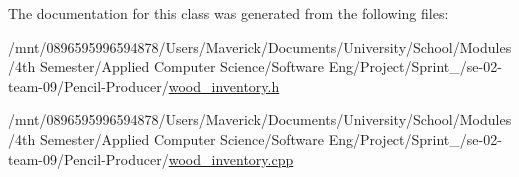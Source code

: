 The documentation for this class was generated from the following files\+:\begin{DoxyCompactItemize}
\item 
/mnt/0896595996594878/\+Users/\+Maverick/\+Documents/\+University/\+School/\+Modules/4th Semester/\+Applied Computer Science/\+Software Eng/\+Project/\+Sprint\+\_/se-\/02-\/team-\/09/\+Pencil-\/\+Producer/\hyperlink{wood__inventory_8h}{wood\+\_\+inventory.\+h}\item 
/mnt/0896595996594878/\+Users/\+Maverick/\+Documents/\+University/\+School/\+Modules/4th Semester/\+Applied Computer Science/\+Software Eng/\+Project/\+Sprint\+\_/se-\/02-\/team-\/09/\+Pencil-\/\+Producer/\hyperlink{wood__inventory_8cpp}{wood\+\_\+inventory.\+cpp}\end{DoxyCompactItemize}
